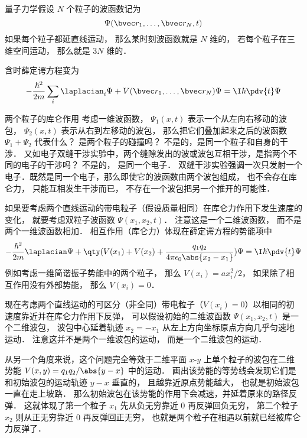 
\begin{issues}
\issueDraft
\end{issues}


量子力学假设 $N$ 个粒子的波函数记为
\begin{equation}
\Psi(\bvec r_1, \dots, \bvec r_N, t)
\end{equation}
如果每个粒子都延直线运动， 那么某时刻波函数就是 $N$ 维的， 若每个粒子在三维空间运动， 那么就是 $3N$ 维的．

含时薛定谔方程变为
\begin{equation}
-\frac{\hbar^2}{2m} \sum_i\laplacian_i \Psi + V(\bvec r_1, \dots, \bvec r_N) \Psi = \I \hbar \pdv{t}\Psi
\end{equation}


\begin{example}{两个粒子的库仑作用}
考虑一维波函数， $\Psi_1(x,t)$ 表示一个从左向右移动的波包， $\Psi_2(x,t)$ 表示从右到左移动的波包， 那么把它们叠加起来之后的波函数 $\Psi_1 + \Psi_2$ 代表什么？ 是两个粒子的碰撞吗？ 不是的，是同一个粒子和自身的干涉． 又如电子双缝干涉实验中，两个缝隙发出的波或波包互相干涉，是指两个不同的电子的干涉吗？ 不是的， 是同一个电子． 双缝干涉实验强调一次只发射一个电子．既然是同一个电子，那么即使它的波函数由两个波包组成， 也不会存在库仑力， 只能互相发生干涉而已， 不存在一个波包把另一个推开的可能性．

如果要考虑两个直线运动的带电粒子（假设质量相同）在库仑力作用下发生速度的变化， 就要考虑双粒子波函数 $\Psi(x_1, x_2, t)$． 注意这是一个二维波函数， 而不是两个一维波函数相加． 相互作用（库仑力）体现在薛定谔方程的势能项中
\begin{equation}
-\frac{\hbar^2}{2m}\laplacian \Psi + \qty(V(x_1) + V(x_2) + \frac{q_1 q_2}{4\pi\epsilon_0\abs{x_2 - x_1}}) \Psi = \I\hbar \pdv{t}\Psi
\end{equation}
例如考虑一维简谐振子势能中的两个粒子， 那么 $V(x_i) = ax_i^2/2$， 如果除了相互作用没有外部势能， 那么 $V(x_i) = 0$．

现在考虑两个直线运动的可区分（非全同）带电粒子（$V(x_i) = 0$）以相同的初速度靠近并在库仑力作用下反弹， 可以假设初始的二维波函数 $\Psi(x_1, x_2, t)$ 是一个二维波包， 波包中心延着轨迹 $x_2 = -x_1$ 从左上方向坐标原点方向几乎匀速地运动． 注意这并不是两个一维波包的运动， 而是一个二维波包的运动．

从另一个角度来说，这个问题完全等效于二维平面 $x$-$y$ 上单个粒子的波包在二维势能 $V(x,y) = q_1q_2/\abs{y-x}$ 中的运动． 画出该势能的等势线会发现它们是和初始波包的运动轨迹 $y-x$ 垂直的， 且越靠近原点势能越大， 也就是初始波包一直在走上坡路． 那么初始波包在该势能的作用下会减速，并延着原来的路径反弹． 这就体现了第一个粒子 $x_1$ 先从负无穷靠近 $0$ 再反弹回负无穷， 第二个粒子 $x_2$ 则从正无穷靠近 $0$ 再反弹回正无穷， 也就是两个粒子在相遇以前就已经被库仑力反弹了．
\end{example}
